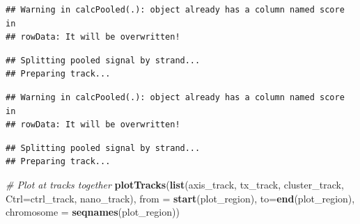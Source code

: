 \documentclass[9pt,a4paper,]{extarticle}
\newenvironment{Shaded}{\begin{snugshade}}{\end{snugshade}}
\newcommand{\KeywordTok}[1]{\textcolor[rgb]{0.13,0.29,0.53}{\textbf{{#1}}}}
\newcommand{\DataTypeTok}[1]{\textcolor[rgb]{0.13,0.29,0.53}{{#1}}}
\newcommand{\StringTok}[1]{\textcolor[rgb]{0.31,0.60,0.02}{{#1}}}
\newcommand{\CommentTok}[1]{\textcolor[rgb]{0.56,0.35,0.01}{\textit{{#1}}}}
\newcommand{\NormalTok}[1]{{#1}}
\begin{document}
\begin{verbatim}
## Warning in calcPooled(.): object already has a column named score in
## rowData: It will be overwritten!
\end{verbatim}

\begin{verbatim}
## Splitting pooled signal by strand...
## Preparing track...
\end{verbatim}

\begin{Shaded}
\end{Shaded}

\begin{verbatim}
## Warning in calcPooled(.): object already has a column named score in
## rowData: It will be overwritten!
\end{verbatim}

\begin{verbatim}
## Splitting pooled signal by strand...
## Preparing track...
\end{verbatim}

\begin{Shaded}
\begin{Highlighting}[]
\CommentTok{# Plot at tracks together}
\KeywordTok{plotTracks}\NormalTok{(}\KeywordTok{list}\NormalTok{(axis_track, }
                \NormalTok{tx_track, }
                \NormalTok{cluster_track, }
                \DataTypeTok{Ctrl=}\NormalTok{ctrl_track, }
                \NormalTok{nano_track),}
           \DataTypeTok{from =} \KeywordTok{start}\NormalTok{(plot_region), }
           \DataTypeTok{to=}\KeywordTok{end}\NormalTok{(plot_region), }
           \DataTypeTok{chromosome =} \KeywordTok{seqnames}\NormalTok{(plot_region))}
\end{Highlighting}
\end{Shaded}
\end{document}
